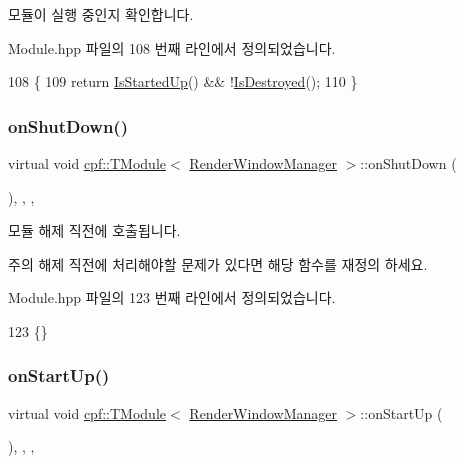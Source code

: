 모듈이 실행 중인지 확인합니다. 

Module.\+hpp 파일의 108 번째 라인에서 정의되었습니다.


\begin{DoxyCode}
108                                 \{
109             \textcolor{keywordflow}{return} \hyperlink{classcpf_1_1_t_module_a73732afee7131dad652bf3e00c75cef9}{IsStartedUp}() && !\hyperlink{classcpf_1_1_t_module_a9f70f0a70ac59b13b7a874f82c877337}{IsDestroyed}();
110         \}
\end{DoxyCode}
\mbox{\label{classcpf_1_1_t_module_a15c93b1aca54022e145961bea8e3ea7d}} 
\subsubsection{\texorpdfstring{on\+Shut\+Down()}{onShutDown()}}
{\footnotesize\ttfamily virtual void \hyperlink{classcpf_1_1_t_module}{cpf\+::\+T\+Module}$<$ \hyperlink{classcpf_1_1_render_window_manager}{Render\+Window\+Manager}  $>$\+::on\+Shut\+Down (\begin{DoxyParamCaption}{ }\end{DoxyParamCaption})\hspace{0.3cm}{\ttfamily [inline]}, {\ttfamily [protected]}, {\ttfamily [virtual]}, {\ttfamily [inherited]}}

모듈 해제 직전에 호출됩니다. \begin{DoxyNote}{주의}
해제 직전에 처리해야할 문제가 있다면 해당 함수를 재정의 하세요. 
\end{DoxyNote}


Module.\+hpp 파일의 123 번째 라인에서 정의되었습니다.


\begin{DoxyCode}
123 \{\}
\end{DoxyCode}
\mbox{\label{classcpf_1_1_t_module_a4eb83b0848794e422d2d345439f51a04}} 
\subsubsection{\texorpdfstring{on\+Start\+Up()}{onStartUp()}}
{\footnotesize\ttfamily virtual void \hyperlink{classcpf_1_1_t_module}{cpf\+::\+T\+Module}$<$ \hyperlink{classcpf_1_1_render_window_manager}{Render\+Window\+Manager}  $>$\+::on\+Start\+Up (\begin{DoxyParamCaption}{ }\end{DoxyParamCaption})\hspace{0.3cm}{\ttfamily [inline]}, {\ttfamily [protected]}, {\ttfamily [virtual]}, {\ttfamily [inherited]}}


